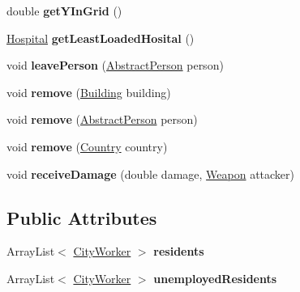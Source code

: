 \begin{DoxyCompactItemize}
\item 
double {\bfseries get\+Y\+In\+Grid} ()\hypertarget{classcities_1_1_city_ac574b98b0ef0bd0127011275bb9d2f00}{}\label{classcities_1_1_city_ac574b98b0ef0bd0127011275bb9d2f00}

\item 
\hyperlink{classbuildings_1_1workplaces_1_1_hospital}{Hospital} {\bfseries get\+Least\+Loaded\+Hosital} ()\hypertarget{classcities_1_1_city_a7b2dff5fe65feebdf8ee391fb5a53e29}{}\label{classcities_1_1_city_a7b2dff5fe65feebdf8ee391fb5a53e29}

\item 
void {\bfseries leave\+Person} (\hyperlink{classpeople_1_1_abstract_person}{Abstract\+Person} person)\hypertarget{classcities_1_1_city_a6e4fa50cc2905d57f3dc5f74b66e870a}{}\label{classcities_1_1_city_a6e4fa50cc2905d57f3dc5f74b66e870a}

\item 
void {\bfseries remove} (\hyperlink{classbuildings_1_1_building}{Building} building)\hypertarget{classcities_1_1_city_a5411e3a502930f4aed6900a19b0dba80}{}\label{classcities_1_1_city_a5411e3a502930f4aed6900a19b0dba80}

\item 
void {\bfseries remove} (\hyperlink{classpeople_1_1_abstract_person}{Abstract\+Person} person)\hypertarget{classcities_1_1_city_a5a54be37aeebe349ad2de33bdca2066e}{}\label{classcities_1_1_city_a5a54be37aeebe349ad2de33bdca2066e}

\item 
void {\bfseries remove} (\hyperlink{classplanets_1_1_country}{Country} country)\hypertarget{classcities_1_1_city_a82a7bf9ba2376b7c0ed8a7f0204f84b5}{}\label{classcities_1_1_city_a82a7bf9ba2376b7c0ed8a7f0204f84b5}

\item 
void {\bfseries receive\+Damage} (double damage, \hyperlink{classtools_1_1weapons_1_1_weapon}{Weapon} attacker)\hypertarget{classcities_1_1_city_a5e0e90fe1d810caa9e3f12ca2e315746}{}\label{classcities_1_1_city_a5e0e90fe1d810caa9e3f12ca2e315746}

\end{DoxyCompactItemize}
\subsection*{Public Attributes}
\begin{DoxyCompactItemize}
\item 
Array\+List$<$ \hyperlink{classpeople_1_1cityworkers_1_1_city_worker}{City\+Worker} $>$ {\bfseries residents}\hypertarget{classcities_1_1_city_a5801abf92e106187ebcc3260b57dc6be}{}\label{classcities_1_1_city_a5801abf92e106187ebcc3260b57dc6be}

\item 
Array\+List$<$ \hyperlink{classpeople_1_1cityworkers_1_1_city_worker}{City\+Worker} $>$ {\bfseries unemployed\+Residents}\hypertarget{classcities_1_1_city_ae1f0dff47bb5c46b98270fb3739bacda}{}\label{classcities_1_1_city_ae1f0dff47bb5c46b98270fb3739bacda}

\end{DoxyCompactItemize}
